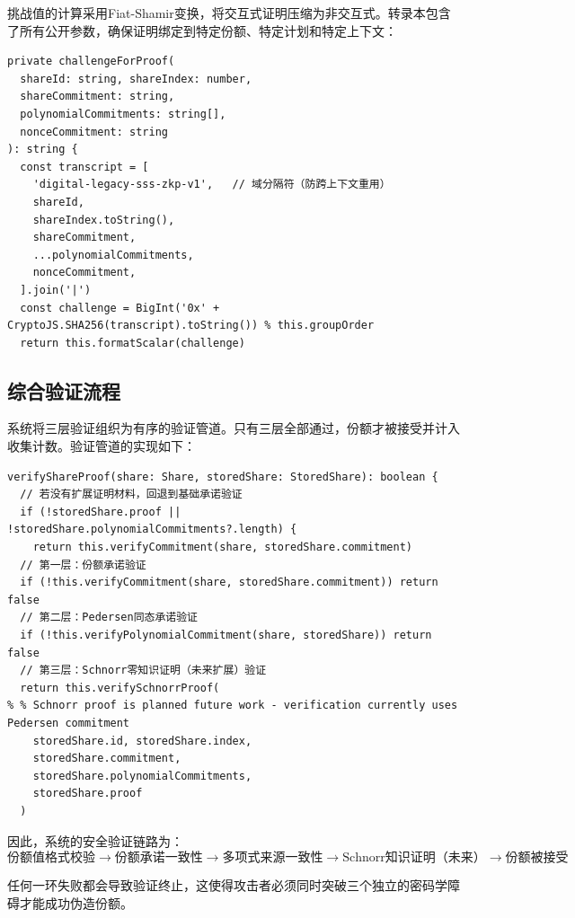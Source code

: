 \documentclass[UTF8,a4paper,zihao=-4,openany]{ctexrep}
\begin{document}
挑战值的计算采用Fiat-Shamir变换，将交互式证明压缩为非交互式。转录本包含了所有公开参数，确保证明绑定到特定份额、特定计划和特定上下文：

\begin{lstlisting}[caption={Fiat-Shamir挑战生成 (shamir.ts:222-239)}]
private challengeForProof(
  shareId: string, shareIndex: number,
  shareCommitment: string,
  polynomialCommitments: string[],
  nonceCommitment: string
): string {
  const transcript = [
    'digital-legacy-sss-zkp-v1',   // 域分隔符（防跨上下文重用）
    shareId,
    shareIndex.toString(),
    shareCommitment,
    ...polynomialCommitments,
    nonceCommitment,
  ].join('|')
  const challenge = BigInt('0x' + CryptoJS.SHA256(transcript).toString()) % this.groupOrder
  return this.formatScalar(challenge)
\end{lstlisting}

\subsection{综合验证流程}

系统将三层验证组织为有序的验证管道。只有三层全部通过，份额才被接受并计入收集计数。验证管道的实现如下：

\begin{lstlisting}[caption={综合份额验证 (shamir.ts:109-128)}]
verifyShareProof(share: Share, storedShare: StoredShare): boolean {
  // 若没有扩展证明材料，回退到基础承诺验证
  if (!storedShare.proof || !storedShare.polynomialCommitments?.length) {
    return this.verifyCommitment(share, storedShare.commitment)
  // 第一层：份额承诺验证
  if (!this.verifyCommitment(share, storedShare.commitment)) return false
  // 第二层：Pedersen同态承诺验证
  if (!this.verifyPolynomialCommitment(share, storedShare)) return false
  // 第三层：Schnorr零知识证明（未来扩展）验证
  return this.verifySchnorrProof(
% % Schnorr proof is planned future work - verification currently uses Pedersen commitment
    storedShare.id, storedShare.index,
    storedShare.commitment,
    storedShare.polynomialCommitments,
    storedShare.proof
  )
\end{lstlisting}

因此，系统的安全验证链路为：
\[
\text{份额值格式校验} \longrightarrow \text{份额承诺一致性} \longrightarrow \text{多项式来源一致性} \longrightarrow \text{Schnorr知识证明（未来）} \longrightarrow \text{份额被接受}
\]

任何一环失败都会导致验证终止，这使得攻击者必须同时突破三个独立的密码学障碍才能成功伪造份额。
\end{document}
